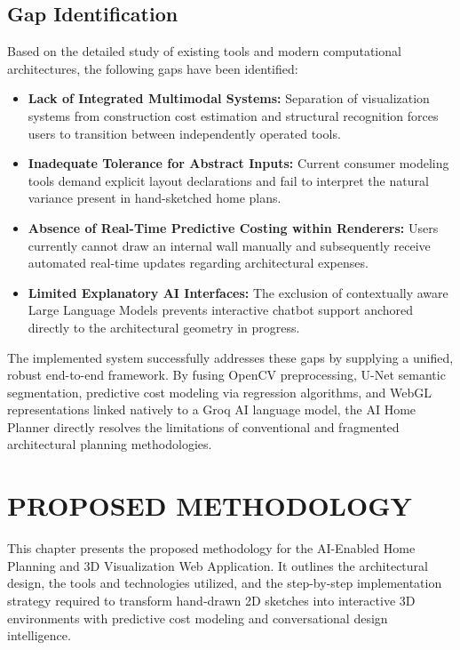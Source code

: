 \documentclass[12pt]{report}
\begin{document}
\section{Gap Identification}

Based on the detailed study of existing tools and modern computational architectures, the following gaps have been identified:

\begin{itemize}
  \item \textbf{Lack of Integrated Multimodal Systems:} Separation of visualization systems from construction cost estimation and structural recognition forces users to transition between independently operated tools.
  \item \textbf{Inadequate Tolerance for Abstract Inputs:} Current consumer modeling tools demand explicit layout declarations and fail to interpret the natural variance present in hand-sketched home plans.
  \item \textbf{Absence of Real-Time Predictive Costing within Renderers:} Users currently cannot draw an internal wall manually and subsequently receive automated real-time updates regarding architectural expenses.
  \item \textbf{Limited Explanatory AI Interfaces:} The exclusion of contextually aware Large Language Models prevents interactive chatbot support anchored directly to the architectural geometry in progress.
\end{itemize}

The implemented system successfully addresses these gaps by supplying a unified, robust end-to-end framework. By fusing OpenCV preprocessing, U-Net semantic segmentation, predictive cost modeling via regression algorithms, and WebGL representations linked natively to a Groq AI language model, the AI Home Planner directly resolves the limitations of conventional and fragmented architectural planning methodologies.


\chapter{PROPOSED METHODOLOGY}

This chapter presents the proposed methodology for the AI-Enabled Home Planning and 3D Visualization Web Application. It outlines the architectural design, the tools and technologies utilized, and the step-by-step implementation strategy required to transform hand-drawn 2D sketches into interactive 3D environments with predictive cost modeling and conversational design intelligence\cite{ronneberger2015, liu2017, wang2020}.
\end{document}
